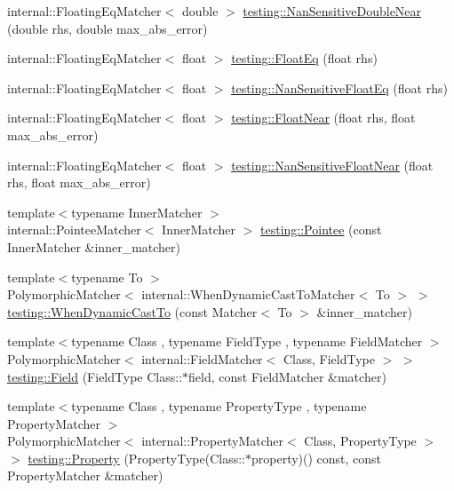 \begin{DoxyCompactItemize}
\item 
internal\+::\+Floating\+Eq\+Matcher$<$ double $>$ \hyperlink{namespacetesting_a3caa8177ef48150d0dde3a54b0961f7f}{testing\+::\+Nan\+Sensitive\+Double\+Near} (double rhs, double max\+\_\+abs\+\_\+error)
\item 
internal\+::\+Floating\+Eq\+Matcher$<$ float $>$ \hyperlink{namespacetesting_ac75507edb7998957b48fb17a9b8a020b}{testing\+::\+Float\+Eq} (float rhs)
\item 
internal\+::\+Floating\+Eq\+Matcher$<$ float $>$ \hyperlink{namespacetesting_ab3653439a654b85bdccff46d1436670d}{testing\+::\+Nan\+Sensitive\+Float\+Eq} (float rhs)
\item 
internal\+::\+Floating\+Eq\+Matcher$<$ float $>$ \hyperlink{namespacetesting_a933a78452dd1770669bed758f35ff250}{testing\+::\+Float\+Near} (float rhs, float max\+\_\+abs\+\_\+error)
\item 
internal\+::\+Floating\+Eq\+Matcher$<$ float $>$ \hyperlink{namespacetesting_a347ebf0075ca9470e71e8ac468c9818f}{testing\+::\+Nan\+Sensitive\+Float\+Near} (float rhs, float max\+\_\+abs\+\_\+error)
\item 
{\footnotesize template$<$typename Inner\+Matcher $>$ }\\internal\+::\+Pointee\+Matcher$<$ Inner\+Matcher $>$ \hyperlink{namespacetesting_a5122ca3533f3a00f67e146dd81f3b68c}{testing\+::\+Pointee} (const Inner\+Matcher \&inner\+\_\+matcher)
\item 
{\footnotesize template$<$typename To $>$ }\\Polymorphic\+Matcher$<$ internal\+::\+When\+Dynamic\+Cast\+To\+Matcher$<$ To $>$ $>$ \hyperlink{namespacetesting_aabfc320cc132d0a1da2a255b45a17b7a}{testing\+::\+When\+Dynamic\+Cast\+To} (const Matcher$<$ To $>$ \&inner\+\_\+matcher)
\item 
{\footnotesize template$<$typename Class , typename Field\+Type , typename Field\+Matcher $>$ }\\Polymorphic\+Matcher$<$ internal\+::\+Field\+Matcher$<$ Class, Field\+Type $>$ $>$ \hyperlink{namespacetesting_a4df3849391696aa93ac3a7703a717c2a}{testing\+::\+Field} (Field\+Type Class\+::$\ast$field, const Field\+Matcher \&matcher)
\item 
{\footnotesize template$<$typename Class , typename Property\+Type , typename Property\+Matcher $>$ }\\Polymorphic\+Matcher$<$ internal\+::\+Property\+Matcher$<$ Class, Property\+Type $>$ $>$ \hyperlink{namespacetesting_a0fad10571e23f7bc0d5c83d4c31ba740}{testing\+::\+Property} (Property\+Type(Class\+::$\ast$property)() const, const Property\+Matcher \&matcher)

\end{DoxyCompactItemize}
